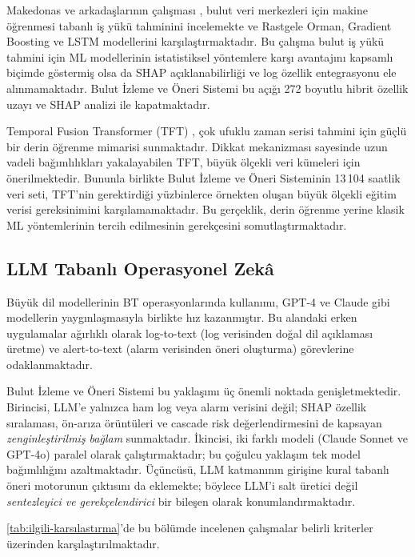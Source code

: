 Makedonas ve arkadaşlarının çalışması \autocite{makedonas2022}, bulut veri merkezleri için makine öğrenmesi tabanlı iş yükü tahminini incelemekte ve Rastgele Orman, Gradient Boosting ve LSTM modellerini karşılaştırmaktadır.
Bu çalışma bulut iş yükü tahmini için ML modellerinin istatistiksel yöntemlere karşı avantajını kapsamlı biçimde göstermiş olsa da SHAP açıklanabilirliği ve log özellik entegrasyonu ele alınmamaktadır.
Bulut İzleme ve Öneri Sistemi bu açığı 272 boyutlu hibrit özellik uzayı ve SHAP analizi ile kapatmaktadır.

Temporal Fusion Transformer (TFT) \autocite{lim2021}, çok ufuklu zaman serisi tahmini için güçlü bir derin öğrenme mimarisi sunmaktadır.
Dikkat mekanizması sayesinde uzun vadeli bağımlılıkları yakalayabilen TFT, büyük ölçekli veri kümeleri için önerilmektedir.
Bununla birlikte Bulut İzleme ve Öneri Sisteminin 13\,104 saatlik veri seti, TFT'nin gerektirdiği yüzbinlerce örnekten oluşan büyük ölçekli eğitim verisi gereksinimini karşılamamaktadır.
Bu gerçeklik, derin öğrenme yerine klasik ML yöntemlerinin tercih edilmesinin gerekçesini somutlaştırmaktadır.

\subsection{LLM Tabanlı Operasyonel Zekâ}

Büyük dil modellerinin BT operasyonlarında kullanımı, GPT-4 \autocite{openai2023} ve Claude \autocite{anthropic2024} gibi modellerin yaygınlaşmasıyla birlikte hız kazanmıştır.
Bu alandaki erken uygulamalar ağırlıklı olarak log-to-text (log verisinden doğal dil açıklaması üretme) ve alert-to-text (alarm verisinden öneri oluşturma) görevlerine odaklanmaktadır.

Bulut İzleme ve Öneri Sistemi bu yaklaşımı üç önemli noktada genişletmektedir.
Birincisi, LLM'e yalnızca ham log veya alarm verisini değil; SHAP özellik sıralaması, ön-arıza örüntüleri ve cascade risk değerlendirmesini de kapsayan \textit{zenginleştirilmiş bağlam} sunmaktadır.
İkincisi, iki farklı modeli (Claude Sonnet ve GPT-4o) paralel olarak çalıştırmaktadır; bu çoğulcu yaklaşım tek model bağımlılığını azaltmaktadır.
Üçüncüsü, LLM katmanının girişine kural tabanlı öneri motorunun çıktısını da eklemekte; böylece LLM'i salt üretici değil \textit{sentezleyici ve gerekçelendirici} bir bileşen olarak konumlandırmaktadır.

\autoref{tab:ilgili-karsılastırma}'de bu bölümde incelenen çalışmalar belirli kriterler üzerinden karşılaştırılmaktadır.

